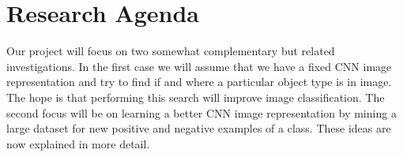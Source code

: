 \documentclass[a4paper]{article}
\begin{document}




\section{Research Agenda}

Our project will focus on two somewhat complementary but related
investigations. In the first case we will assume that we have a fixed
CNN image representation and try to find if and where a particular
object type is in image. The hope is that performing this search will
improve image classification.  The second focus will be on learning a
better CNN image representation by mining a large dataset for new
positive and negative examples of a class. These ideas are now
explained in more detail.
\end{document}
